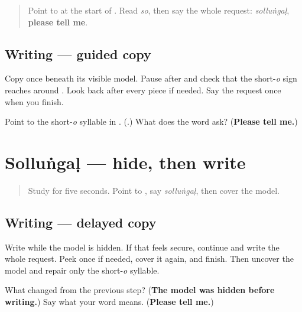 \label{lesson:TA-W08-sollungal-guided-copy}



\begin{quote}
Point to \textbf{} at the start of \textbf{}. Read \emph{so}, then say the whole request: \emph{solluṅgaḷ}, \textbf{please tell me}.
\end{quote}

\subsection*{Writing — guided copy}
Copy \textbf{} once beneath its visible model. Pause after \textbf{} and check that the short-\emph{o} sign reaches around \textbf{}. Look back after every piece if needed. Say the request once when you finish.

\begin{tcolorbox}[breakable,colback=teal!4,colframe=teal!35!black,title={Before you move on}]
Point to the short-\emph{o} syllable in \textbf{}. (\textbf{}.) What does the word ask? (\textbf{Please tell me.})
\end{tcolorbox}
\section[\texorpdfstring{\ta{சொல்லுங்கள்} (solluṅgaḷ)}{சொல்லுங்கள் (solluṅgaḷ)}]{Solluṅgaḷ — hide, then write}

\label{lesson:TA-W08-sollungal-delayed-copy}



\begin{quote}
Study \textbf{} for five seconds. Point to \textbf{}, say \emph{solluṅgaḷ}, then cover the model.
\end{quote}

\subsection*{Writing — delayed copy}
Write \textbf{} while the model is hidden. If that feels secure, continue and write the whole request. Peek once if needed, cover it again, and finish. Then uncover the model and repair only the short-\emph{o} syllable.

\begin{tcolorbox}[breakable,colback=teal!4,colframe=teal!35!black,title={Before you move on}]
What changed from the previous step? (\textbf{The model was hidden before writing.}) Say what your word means. (\textbf{Please tell me.})
\end{tcolorbox}
